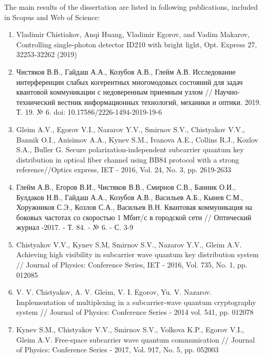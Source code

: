 {The main results of the dissertation are listed in following publications, included in Scopus and Web of Science:}
\begin{enumerate}\addtolength{\itemsep}{-0.5\baselineskip}
\renewcommand{\labelenumi}{[\theenumi]}
\item Vladimir Chistiakov, Anqi Huang, Vladimir Egorov, and Vadim Makarov, Controlling single-photon detector ID210 with bright light, Opt. Express 27, 32253-32262 (2019)
\\
\item Чистяков В.В., Гайдаш А.А., Козубов А.В., Глейм А.В. Исследование интерференции слабых когерентных многомодовых состояний для задач квантовой коммуникации с недоверенным приемным узлом // Научно-технический вестник информационных технологий, механики и оптики. 2019. Т. 19. № 6. doi: 10.17586/2226-1494-2019-19-6
\\
\item    Gleim A.V., Egorov V.I., Nazarov Y.V., Smirnov S.V., Chistyakov V.V., Bannik O.I., Anisimov A.A., Kynev S.M., Ivanova A.E., Collins R.J., Kozlov S.A., Buller G. Secure polarization-independent subcarrier quantum key distribution in optical fiber channel using BB84 protocol with a strong reference//Optics express, IET - 2016, Vol. 24, No. 3, pp. 2619-2633
\\
\item  Глейм А.В., Егоров В.И., Чистяков В.В., Смирнов С.В., Банник О.И., Булдаков Н.В., Гайдаш А.А., Козубов А.В., Васильев А.Б., Кынев С.М., Хоружников С.Э., Козлов С.А., Васильев В.Н. Квантовая коммуникация на боковых частотах со скоростью 1 Мбит/с в городской сети // Оптический журнал -2017. - Т. 84. - № 6. - С. 3-9
\\
\item  Chistyakov V.V., Kynev S.M, Smirnov S.V., Nazarov Y.V., Gleim A.V. Achieving high visibility in subcarrier wave quantum key distribution system // Journal of Physics: Conference Series, IET - 2016, Vol. 735, No. 1, pp. 012085
\\
\item V. V. Chistyakov, A. V. Gleim, V. I. Egorov, Yu. V. Nazarov. Implementation of multiplexing in a subcarrier-wave quantum cryptography system // Journal of Physics: Conference Series - 2014  vol. 541,  pp. 012078
\\
\item   Kynev S.M., Chistyakov V.V., Smirnov S.V., Volkova K.P., Egorov V.I., Gleim A.V. Free-space subcarrier wave quantum communication // Journal of Physics: Conference Series - 2017, Vol. 917, No. 5, pp. 052003
\\


\end{enumerate}

